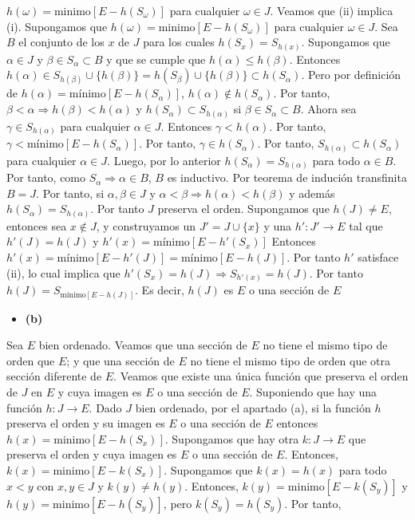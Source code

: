 \documentclass{article}
\begin{document}
$h(\omega)=\text{minimo}[E-h(S_\omega)]$ para cualquier $\omega\in J$. Veamos que (ii) implica (i). Supongamos que $h(\omega)=\text{minimo}[E-h(S_\omega)]$ para cualquier $\omega\in J$. Sea $B$ el conjunto de los $x$ de $J$ para los cuales  $h(S_x)=S_{h(x)}$. Supongamos que $\alpha\in J$ y $\beta \in S_\alpha \subset B$ y que se cumple que $h(\alpha)\leq h(\beta)$. Entonces $h(\alpha)\in S_{h(\beta)}\cup\{ h(\beta)\}=h(S_\beta)\cup\{ h(\beta)\}\subset h(S_\alpha)$. Pero por definición de $h(\alpha)= \text{mínimo}[E-h(S_\alpha)]$, $h(\alpha)\notin h(S_\alpha)$. Por tanto, $\beta<\alpha \Rightarrow h(\beta) < h(\alpha)$ y $h(S_\alpha)\subset S_{h(\alpha)}$ si $\beta \in S_\alpha\subset B$. Ahora sea $\gamma \in S_{h(\alpha)}$ para cualquier $\alpha \in J$. Entonces $\gamma< h(\alpha)$. Por tanto, $\gamma< \text{mínimo}[E-h(S_\alpha)]$. Por tanto, $\gamma \in h(S_\alpha)$. Por tanto, $S_{h(\alpha)} \subset h(S_\alpha)$ para cualquier $\alpha\in J$. Luego, por lo anterior $h(S_\alpha)=S_{h(\alpha)}$ para todo $\alpha \in B$. Por tanto, como $S_\alpha\Rightarrow \alpha \in B$, $B$ es inductivo. Por teorema de indución transfinita $B=J$. Por tanto, si $\alpha,\beta\in J$ y $\alpha<\beta \Rightarrow h(\alpha)<h(\beta)$ y además $h(S_\alpha)=S_{h(\alpha)}$. Por tanto $J$ preserva el orden. Supongamos que $h(J)\neq E$, entonces sea $x\notin J$, y construyamos un $J'=J\cup \{x\}$ y una $h':J'\rightarrow E$ tal que $h'(J)=h(J)$ y  $h'(x) = \text{mínimo}[E-h'(S_x)]$ Entonces  $h'(x) = \text{mínimo}[E-h'(J)]=\text{mínimo}[E-h(J)]$. Por tanto $h'$ satisface (ii), lo cual implica que $h'(S_x)=h(J)\Rightarrow S_{h'(x)}=h(J)$. Por tanto $h(J)=S_{\text{mínimo}[E-h(J)]}$. Es decir, $h(J)$ es $E$ o una sección de $E$ 
\begin{itemize}
\item \bf(b)\rm
\end{itemize}
Sea $E$ bien ordenado. Veamos que una sección de $E$ no tiene el mismo tipo de orden que $E$; y que una sección de $E$ no tiene el mismo tipo de orden que otra sección diferente de $E$. Veamos que existe una única función que preserva el orden de $J$ en $E$ y cuya imagen es $E$ o una sección de $E$. Suponiendo que hay una función $h:J\rightarrow E$. Dado $J$ bien ordenado, por el apartado (a), si la función $h$  preserva el orden y su imagen es $E$ o una sección de $E$ entonces $h(x)=\text{minimo}[E-h(S_x)]$. Supongamos que hay otra $k:J\rightarrow E$ que preserva el orden y cuya imagen es $E$ o una sección de $E$. Entonces, $k(x)=\text{minimo}[E-k(S_x)]$. Supongamos que $k(x)=h(x)$ para todo $x<y$ con $x,y\in J$ y $k(y)\neq h(y)$. Entonces, $k(y)=\text{minimo}[E-k(S_y)]$ y $h(y)=\text{minimo}[E-h(S_y)]$, pero $k(S_y)=h(S_y)$. Por tanto, 
\end{document}
